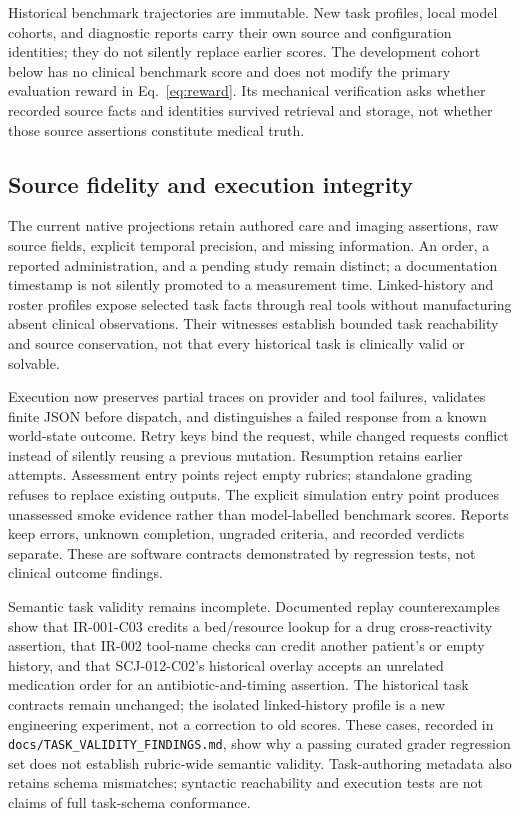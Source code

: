 Historical benchmark trajectories are immutable. New task profiles, local
model cohorts, and diagnostic reports carry their own source and configuration
identities; they do not silently replace earlier scores. The development
cohort below has no clinical benchmark score and does not modify the primary
evaluation reward in Eq.~\ref{eq:reward}. Its mechanical verification asks
whether recorded source facts and identities survived retrieval and storage,
not whether those source assertions constitute medical truth.

\subsection{Source fidelity and execution integrity}
The current native projections retain authored care and imaging assertions,
raw source fields, explicit temporal precision, and missing information.
An order, a reported administration, and a pending study remain distinct;
a documentation timestamp is not silently promoted to a measurement time.
Linked-history and roster profiles expose selected task facts through real
tools without manufacturing absent clinical observations. Their witnesses
establish bounded task reachability and source conservation, not that every
historical task is clinically valid or solvable.

Execution now preserves partial traces on provider and tool failures,
validates finite JSON before dispatch, and distinguishes a failed response
from a known world-state outcome. Retry keys bind the request, while changed
requests conflict instead of silently reusing a previous mutation. Resumption
retains earlier attempts. Assessment entry points reject empty rubrics;
standalone grading refuses to replace existing outputs. The explicit
simulation entry point produces unassessed smoke evidence rather than
model-labelled benchmark scores. Reports keep errors, unknown completion,
ungraded criteria, and recorded verdicts separate. These are software
contracts demonstrated by regression tests, not clinical outcome findings.

Semantic task validity remains incomplete. Documented replay counterexamples
show that IR-001-C03 credits a bed/resource lookup for a drug cross-reactivity
assertion, that IR-002 tool-name checks can credit another patient's or empty
history, and that SCJ-012-C02's historical overlay accepts an unrelated
medication order for an antibiotic-and-timing assertion. The historical task
contracts remain unchanged; the isolated linked-history profile is a new
engineering experiment, not a correction to old scores. These cases, recorded
in \texttt{docs/TASK\_VALIDITY\_FINDINGS.md}, show why a passing curated grader
regression set does not establish rubric-wide semantic validity. Task-authoring
metadata also retains schema mismatches; syntactic reachability and execution
tests are not claims of full task-schema conformance.


